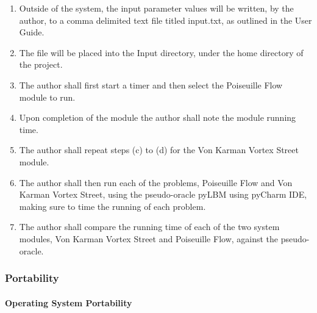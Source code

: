 \documentclass[12pt, titlepage]{article}
\begin{document}
\begin{enumerate}
\begin{enumerate}
\item Outside of the system, the input parameter values will be written, by the
author, to a comma delimited text file titled input.txt, as outlined in the User
Guide.
\item The file will be placed into the Input directory, under the home directory
of the project.
\item The author shall first start a timer and then select the Poiseuille Flow
module to run.
\item Upon completion of the module the author shall note the module running
time.
\item The author shall repeat steps (c) to (d) for the Von Karman Vortex Street
module.
\item The author shall then run each of the problems, Poiseuille Flow and Von
Karman Vortex Street, using the pseudo-oracle pyLBM using pyCharm IDE, making
sure to time the running of each problem.
\item The author shall compare the running time of each of the two system
modules, Von Karman Vortex Street and Poiseuille Flow, against the
pseudo-oracle.
\end{enumerate}

\end{enumerate}


\subsubsection{Portability}
		
\paragraph{Operating System Portability}
\end{document}
